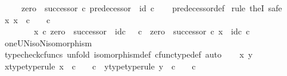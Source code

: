 \begin{isabellebody}
\ \ \ \ {\isasymand}\ {\isacharparenleft}{\kern0pt}zero\ {\isasymamalg}\ successor{\isacharparenright}{\kern0pt}\ {\isasymcirc}\isactrlsub c\ predecessor{\isacharprime}{\kern0pt}\ {\isacharequal}{\kern0pt}\ id\ {\isasymnat}\isactrlsub c{\isachardoublequoteclose}\isanewline
%
\isadelimproof
\ \ %
\endisadelimproof
%
\isatagproof
{}\isamarkupfalse%
\ predecessor{\isacharprime}{\kern0pt}{\isacharunderscore}{\kern0pt}def\isanewline
{}\isamarkupfalse%
\ {\isacharparenleft}{\kern0pt}rule\ theI{\isacharprime}{\kern0pt}{\isacharcomma}{\kern0pt}\ safe{\isacharparenright}{\kern0pt}\isanewline
\ \ \isamarkupfalse%
\ {\isachardoublequoteopen}{\isasymexists}x{\isachardot}{\kern0pt}\ x\ {\isacharcolon}{\kern0pt}\ {\isasymnat}\isactrlsub c\ {\isasymrightarrow}\ {\isasymone}\ {\isasymCoprod}\ {\isasymnat}\isactrlsub c\ {\isasymand}\isanewline
\ \ \ \ \ \ \ \ x\ {\isasymcirc}\isactrlsub c\ zero\ {\isasymamalg}\ successor\ {\isacharequal}{\kern0pt}\ id\isactrlsub c\ {\isacharparenleft}{\kern0pt}{\isasymone}\ {\isasymCoprod}\ {\isasymnat}\isactrlsub c{\isacharparenright}{\kern0pt}\ {\isasymand}\ zero\ {\isasymamalg}\ successor\ {\isasymcirc}\isactrlsub c\ x\ {\isacharequal}{\kern0pt}\ id\isactrlsub c\ {\isasymnat}\isactrlsub c{\isachardoublequoteclose}\isanewline
\ \ \ \ \isamarkupfalse%
\ oneUN{\isacharunderscore}{\kern0pt}iso{\isacharunderscore}{\kern0pt}N{\isacharunderscore}{\kern0pt}isomorphism\ \isamarkupfalse%
\ {\isacharparenleft}{\kern0pt}typecheck{\isacharunderscore}{\kern0pt}cfuncs{\isacharcomma}{\kern0pt}\ unfold\ isomorphism{\isacharunderscore}{\kern0pt}def\ cfunc{\isacharunderscore}{\kern0pt}type{\isacharunderscore}{\kern0pt}def{\isacharcomma}{\kern0pt}\ auto{\isacharparenright}{\kern0pt}\isanewline
{}\isamarkupfalse%
\isanewline
\ \ \isamarkupfalse%
\ x\ y\isanewline
\ \ \isamarkupfalse%
\ x{\isacharunderscore}{\kern0pt}type{\isacharbrackleft}{\kern0pt}type{\isacharunderscore}{\kern0pt}rule{\isacharbrackright}{\kern0pt}{\isacharcolon}{\kern0pt}\ {\isachardoublequoteopen}x\ {\isacharcolon}{\kern0pt}\ {\isasymnat}\isactrlsub c\ {\isasymrightarrow}\ {\isasymone}\ {\isasymCoprod}\ {\isasymnat}\isactrlsub c{\isachardoublequoteclose}\ \ y{\isacharunderscore}{\kern0pt}type{\isacharbrackleft}{\kern0pt}type{\isacharunderscore}{\kern0pt}rule{\isacharbrackright}{\kern0pt}{\isacharcolon}{\kern0pt}\ {\isachardoublequoteopen}y\ {\isacharcolon}{\kern0pt}\ {\isasymnat}\isactrlsub c\ {\isasymrightarrow}\ {\isasymone}\ {\isasymCoprod}\ {\isasymnat}\isactrlsub c{\isachardoublequoteclose}\isanewline

\end{isabellebody}
